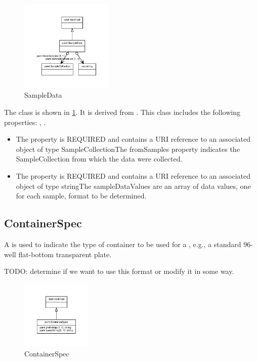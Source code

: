 \begin{figure}[h!]%
\centering%
\includegraphics[width=0.3946808510638298\textwidth]{labop_classes/SampleData_abstraction_hierarchy.pdf}%
\caption{SampleData}%
\label{fig:SampleData}%
\end{figure}

%
The  class is shown in \ref{fig:SampleData}. It is derived from .%
This class includes the following properties: , . %
\begin{itemize}%
\item%
The  property is REQUIRED and contains a URI reference to an associated object of type SampleCollectionThe fromSamples property indicates the SampleCollection from which the data were collected.%
\item%
The  property is REQUIRED and contains a URI reference to an associated object of type stringThe sampleDataValues are an array of data values, one for each sample, format to be determined.%
\end{itemize}%
\subsection{ContainerSpec}%
\label{sec:labop:ContainerSpec}%
A  is used to indicate the type of container to be used for a , e.g.,
        a standard 96-well flat-bottom transparent plate.

        TODO: determine if we want to use this format or modify it in some way.%
\newline%
\linebreak%


\begin{figure}[h!]%
\centering%
\includegraphics[width=0.29936170212765956\textwidth]{labop_classes/ContainerSpec_abstraction_hierarchy.pdf}%
\caption{ContainerSpec}%
\label{fig:ContainerSpec}%
\end{figure}

